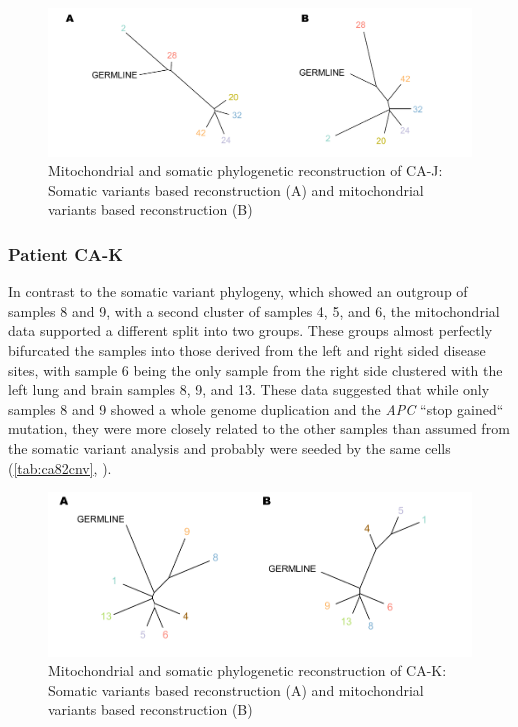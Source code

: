 \begin{figure}[ht]
\centering
\includegraphics[width=.99\linewidth]{Figures/CASCADE/mito/CA80SomVsMitoPhylo.pdf}
\caption[Mitochondrial and somatic phylogenetic reconstruction of CA-J]{Mitochondrial and somatic phylogenetic reconstruction of CA-J: Somatic variants based reconstruction (A) and mitochondrial variants based reconstruction (B)} \label{fig:CA80mitoPhylo}
\end{figure}


\subsubsection{Patient CA-K}

In contrast to the somatic variant phylogeny, which showed an outgroup of samples 8 and 9, with a second cluster of samples 4, 5, and 6, the mitochondrial data supported a different  split into two groups. These groups almost perfectly bifurcated the samples into those derived from the left and right sided disease sites, with sample 6 being the only sample from  the right side clustered with the left lung and brain samples 8, 9, and 13. These data suggested that while only samples 8 and 9 showed a whole genome duplication and the \textit{APC} ``stop gained`` mutation, they were more closely related to the other samples than assumed from the somatic variant analysis and probably were seeded by the same cells (\autoref{tab:ca82cnv}, ).

\begin{figure}[ht]
\centering
\includegraphics[width=.99\linewidth]{Figures/CASCADE/mito/CA82SomVsMitoPhylo.pdf}
\caption[Mitochondrial and somatic phylogenetic reconstruction of CA-K]{Mitochondrial and somatic phylogenetic reconstruction of CA-K: Somatic variants based reconstruction (A) and mitochondrial variants based reconstruction (B)} \label{fig:CA82mitoPhylo}
\end{figure}



